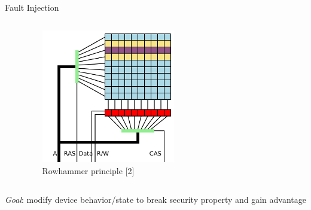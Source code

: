 \begin{frame}[fragile]{Fault Injection}
{\begin{columns}
\begin{column}{0.4\textwidth}
    \end{column}
    \begin{column}{0.6\textwidth}
         {
            \begin{figure}
                \centering
                \caption{Rowhammer principle [2]}
                \includegraphics[width=0.55\textwidth]{img/Row_hammer.svg.png}
            \end{figure}
        }
    \end{column}
\end{columns}
\vfill
        \textit{Goal}: modify device behavior/state to break security property and gain advantage
}
\end{frame}

